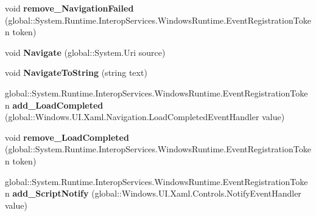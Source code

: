 \begin{DoxyCompactItemize}
\item 
\mbox{\label{interface_windows_1_1_u_i_1_1_xaml_1_1_controls_1_1_i_web_view_a2701e74fa38f2b8566ba2ded21b4f20f}} 
void {\bfseries remove\+\_\+\+Navigation\+Failed} (global\+::\+System.\+Runtime.\+Interop\+Services.\+Windows\+Runtime.\+Event\+Registration\+Token token)
\item 
\mbox{\label{interface_windows_1_1_u_i_1_1_xaml_1_1_controls_1_1_i_web_view_ad6b51d8da7bbcb753718bf0fbdf993e9}} 
void {\bfseries Navigate} (global\+::\+System.\+Uri source)
\item 
\mbox{\label{interface_windows_1_1_u_i_1_1_xaml_1_1_controls_1_1_i_web_view_a5d3ada22753e211f63167cbea88d12f7}} 
void {\bfseries Navigate\+To\+String} (string text)
\item 
\mbox{\label{interface_windows_1_1_u_i_1_1_xaml_1_1_controls_1_1_i_web_view_a13cd0995f18f6d179d71abd176ff1dba}} 
global\+::\+System.\+Runtime.\+Interop\+Services.\+Windows\+Runtime.\+Event\+Registration\+Token {\bfseries add\+\_\+\+Load\+Completed} (global\+::\+Windows.\+U\+I.\+Xaml.\+Navigation.\+Load\+Completed\+Event\+Handler value)
\item 
\mbox{\label{interface_windows_1_1_u_i_1_1_xaml_1_1_controls_1_1_i_web_view_af38e4aa4ca0e989fc46d0f629fd7564e}} 
void {\bfseries remove\+\_\+\+Load\+Completed} (global\+::\+System.\+Runtime.\+Interop\+Services.\+Windows\+Runtime.\+Event\+Registration\+Token token)
\item 
\mbox{\label{interface_windows_1_1_u_i_1_1_xaml_1_1_controls_1_1_i_web_view_aadb8186d118d49d86ee192f2534cac58}} 
global\+::\+System.\+Runtime.\+Interop\+Services.\+Windows\+Runtime.\+Event\+Registration\+Token {\bfseries add\+\_\+\+Script\+Notify} (global\+::\+Windows.\+U\+I.\+Xaml.\+Controls.\+Notify\+Event\+Handler value)
\item 
\mbox{\label{interface_windows_1_1_u_i_1_1_xaml_1_1_controls_1_1_i_web_view_a9bb7e1887eef12d9c592c4b27677ac47}} 

\end{DoxyCompactItemize}
